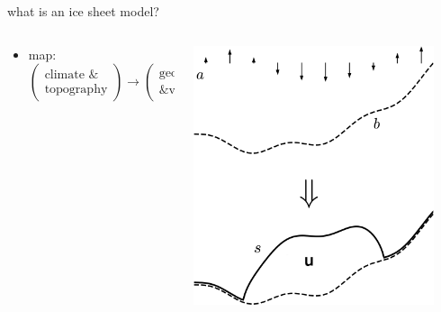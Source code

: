 \documentclass[svgnames,
               hyperref={colorlinks,citecolor=DeepPink4,linkcolor=FireBrick,urlcolor=Maroon},
               usepdftitle=false]  %
               {beamer}
\begin{document}
\begin{frame}{what is an ice sheet model?}
\begin{columns}
\begin{column}{0.6\textwidth}
\begin{itemize}
\bigskip
\item<2-> {\small map: \quad $\begin{pmatrix} \text{climate \&} \\ \text{topography} \end{pmatrix} \to \begin{pmatrix} \text{geometry} \\ \text{\& velocity} \end{pmatrix}$}
\end{itemize}
\end{column}
\begin{column}{0.42\textwidth}
\hfill \includegraphics[width=0.9\textwidth]{images/map-velocity.png}

\vspace{2mm}
\end{column}
\end{columns}
\end{frame}
\end{document}
